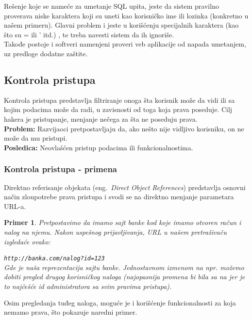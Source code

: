 \documentclass[a4paper]{article}
\newtheorem{primer}{Primer}[section]
\begin{document}
Rešenje koje se nameće za umetanje SQL upita, jeste da sistem pravilno proverava niske karaktera koji su uneti kao korisničko ime ili lozinka (konkretno u našem primeru). Glavni problem i jeste u korišćenju specijalnih karaktera (kao što su = ili ' itd.) \cite{SQL_prev}, te treba navesti sistem da ih ignoriše.\cite{Sanit}\\
Takođe postoje i softveri namenjeni proveri  veb aplikacije od napada umetanjem, uz predloge dodatne zaštite.

\subsection{Kontrola pristupa}

Kontrola pristupa \cite{AC} predstavlja filtriranje onoga šta korisnik može da vidi ili sa kojim podacima može da radi,  u zavisnosti od toga koja prava poseduje. Cilj hakera je pristupanje, menjanje nečega za šta ne poseduju prava.\\
\textbf{Problem:} Razvijaoci pretpostavljaju da, ako nešto nije vidljivo korisniku, on ne može da mu pristupi.\\
\textbf{Posledica:} Neovlašćen pristup podacima ili funkcionalnostima.

\subsubsection{Kontrola pristupa - primena}

Direktno referisanje objekata (eng.~{\em Direct Object References}) predstavlja osnovni način zloupotrebe prava pristupa i svodi se na direktno menjanje parametara URL-a.
\begin{primer}
\label{primer3}
Pretpostavimo da imamo sajt banke kod koje imamo otvoren račun i nalog na njemu. Nakon uspešnog prijavljivanja, URL u našem pretraživaču izgledaće ovako:

\texttt{http://banka.com/nalog?id=123}\\
Gde je  naša reprezentacija sajtu banke. Jednostavnom izmenom  na npr.  možemo dobiti pregled drugog korisničkog naloga (najopasnija promena bi bila sa  na  jer je to najčešće id administratora sa svim pravima pristupa).
\end{primer}

Osim pregledanja tuđeg naloga, moguće je i korišćenje funkcionalnosti za koja nemamo prava, što pokazuje naredni primer.
\end{document}
